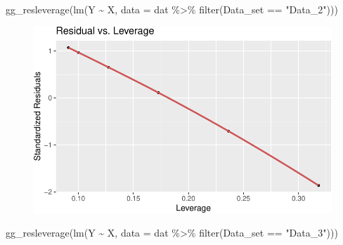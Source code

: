 \documentclass[
  letterpaper,
  DIV=11,
  numbers=noendperiod]{scrreprt}
\newenvironment{Shaded}{\begin{snugshade}}{\end{snugshade}}
\newcommand{\AttributeTok}[1]{\textcolor[rgb]{0.40,0.45,0.13}{#1}}
\newcommand{\FunctionTok}[1]{\textcolor[rgb]{0.28,0.35,0.67}{#1}}
\newcommand{\NormalTok}[1]{\textcolor[rgb]{0.00,0.23,0.31}{#1}}
\newcommand{\SpecialCharTok}[1]{\textcolor[rgb]{0.37,0.37,0.37}{#1}}
\newcommand{\StringTok}[1]{\textcolor[rgb]{0.13,0.47,0.30}{#1}}
\begin{document}
\begin{Shaded}
\begin{Highlighting}[]
\FunctionTok{gg\_resleverage}\NormalTok{(}\FunctionTok{lm}\NormalTok{(Y }\SpecialCharTok{\textasciitilde{}}\NormalTok{ X, }\AttributeTok{data =}\NormalTok{ dat }\SpecialCharTok{\%\textgreater{}\%} \FunctionTok{filter}\NormalTok{(Data\_set }\SpecialCharTok{==} \StringTok{"Data\_2"}\NormalTok{)))}
\end{Highlighting}
\end{Shaded}

\begin{figure}[H]

{\centering \includegraphics{./08-linearreg_files/figure-pdf/unnamed-chunk-29-2.pdf}

}

\end{figure}

\begin{Shaded}
\begin{Highlighting}[]
\FunctionTok{gg\_resleverage}\NormalTok{(}\FunctionTok{lm}\NormalTok{(Y }\SpecialCharTok{\textasciitilde{}}\NormalTok{ X, }\AttributeTok{data =}\NormalTok{ dat }\SpecialCharTok{\%\textgreater{}\%} \FunctionTok{filter}\NormalTok{(Data\_set }\SpecialCharTok{==} \StringTok{"Data\_3"}\NormalTok{)))}
\end{Highlighting}
\end{Shaded}
\end{document}
